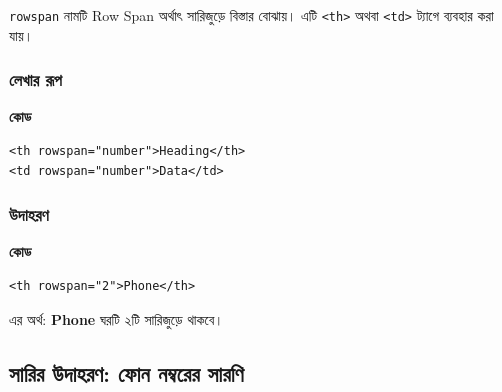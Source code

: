 \texttt{rowspan} নামটি Row Span অর্থাৎ সারিজুড়ে বিস্তার বোঝায়। এটি \texttt{<th>} অথবা \texttt{<td>} ট্যাগে ব্যবহার করা যায়।

\par\noindent
\begin{minipage}[t]{.54\linewidth}\vspace{0pt}\small
\subsubsection{লেখার রূপ}

\textbf{\color{chFourTeal}কোড}\par
\begin{verbatim}
<th rowspan="number">Heading</th>
<td rowspan="number">Data</td>
\end{verbatim}
\par\smallskip
\end{minipage}\hfill
\begin{minipage}[t]{.42\linewidth}\vspace{0pt}\small
\subsubsection{উদাহরণ}

\textbf{\color{chFourTeal}কোড}\par
\begin{verbatim}
<th rowspan="2">Phone</th>
\end{verbatim}
\par\smallskip


এর অর্থ: \textbf{Phone} ঘরটি ২টি সারিজুড়ে থাকবে।
\end{minipage}\par
\subsection{সারির উদাহরণ: ফোন নম্বরের সারণি}

